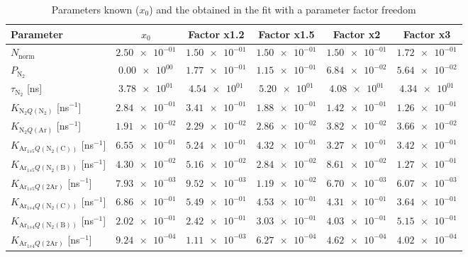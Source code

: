 \begin{table}
\caption{Parameters known ($x_0$) and the obtained in the fit with a parameter factor freedom}
\label{tab:mitabla}
\begin{tabular}{lSSSSS}
\toprule
{Parameter} & {$x_0$} & {Factor x1.2} & {Factor x1.5} & {Factor x2} & {Factor x3} \\
\midrule
$N_{\text{norm}}$ & $\num{2.50e-01}$ & $\num{1.50e-01}$ & $\num{1.50e-01}$ & $\num{1.50e-01}$ & $\num{1.72e-01}$ \\
$P_{\text{N}_2}$ & $\num{0.00e+00}$ & $\num{1.77e-01}$ & $\num{1.15e-01}$ & $\num{6.84e-02}$ & $\num{5.64e-02}$ \\
$\tau_{\text{N}_2}$ [ns] & $\num{3.78e+01}$ & $\num{4.54e+01}$ & $\num{5.20e+01}$ & $\num{4.08e+01}$ & $\num{4.34e+01}$ \\
$K_{\text{N}_2 Q (\text{N}_2)}$ [ns$^{-1}$] & $\num{2.84e-01}$ & $\num{3.41e-01}$ & $\num{1.88e-01}$ & $\num{1.42e-01}$ & $\num{1.26e-01}$ \\
$K_{\text{N}_2 Q (\text{Ar})}$ [ns$^{-1}$] & $\num{1.91e-02}$ & $\num{2.29e-02}$ & $\num{2.86e-02}$ & $\num{3.82e-02}$ & $\num{3.66e-02}$ \\
$K_{\text{Ar}_{1s5} Q (\text{N}_2(\text{C}))}$ [ns$^{-1}$] & $\num{6.55e-01}$ & $\num{5.24e-01}$ & $\num{4.32e-01}$ & $\num{3.27e-01}$ & $\num{3.42e-01}$ \\
$K_{\text{Ar}_{1s5} Q (\text{N}_2(\text{B}))}$ [ns$^{-1}$] & $\num{4.30e-02}$ & $\num{5.16e-02}$ & $\num{2.84e-02}$ & $\num{8.61e-02}$ & $\num{1.27e-01}$ \\
$K_{\text{Ar}_{1s5} Q (\text{2Ar})}$ [ns$^{-1}$] & $\num{7.93e-03}$ & $\num{9.52e-03}$ & $\num{1.19e-02}$ & $\num{6.70e-03}$ & $\num{6.07e-03}$ \\
$K_{\text{Ar}_{1s4} Q (\text{N}_2(\text{C}))}$ [ns$^{-1}$] & $\num{6.86e-01}$ & $\num{5.49e-01}$ & $\num{4.53e-01}$ & $\num{4.31e-01}$ & $\num{3.64e-01}$ \\
$K_{\text{Ar}_{1s4} Q (\text{N}_2(\text{B}))}$ [ns$^{-1}$] & $\num{2.02e-01}$ & $\num{2.42e-01}$ & $\num{3.03e-01}$ & $\num{4.03e-01}$ & $\num{5.15e-01}$ \\
$K_{\text{Ar}_{1s4} Q (\text{2Ar})}$ [ns$^{-1}$] & $\num{9.24e-04}$ & $\num{1.11e-03}$ & $\num{6.27e-04}$ & $\num{4.62e-04}$ & $\num{4.02e-04}$ \\
\bottomrule
\end{tabular}
\end{table}
